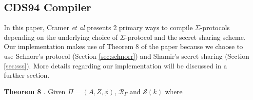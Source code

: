 \subsection{CDS94 Compiler}
In this paper, Cramer {\em{et al}} \cite{CDS94} presents 2 primary ways to compile $\Sigma$-protocols depending on the underlying choice of $\Sigma$-protocol and the secret sharing scheme. Our implementation makes use of Theorem 8 of the paper because we choose to use Schnorr's protocol (Section \ref{sec:schnorr}) and Shamir's secret sharing (Section \ref{sec:sss}). More details regarding our implementation will be discussed in a further section. 








\textbf{Theorem 8 \cite{CDS94}}. Given $\Pi = (A, Z, \phi)$, $\mathcal R_\Gamma$ and $\mathcal S(k)$ where

